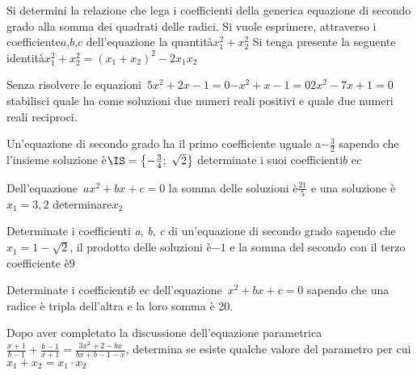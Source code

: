 \begin{esercizio}
 \label{ese:3.70}
Si determini la relazione che lega i coefficienti della generica equazione di 
secondo grado alla somma dei quadrati delle radici. Si vuole esprimere,
attraverso i coefficiente$a$,$b$,$c$ dell'equazione la quantità$x_{1}^{2} + 
x_{2}^{2}$ Si tenga presente la seguente identità$x_{1}^{2} + x_{2}^{2} = 
(x_{1} + x_{2} )^{2}-2 x_{1} x_{2}$
\end{esercizio}

\begin{esercizio}
 \label{ese:3.71}
Senza risolvere le equazioni~$5 x^{2} + 2 x-1 = 0$$-x^{2} + x-1 = 0$$2 
x^{2}-7 x +1 = 0$ stabilisci quale ha come soluzioni due numeri reali positivi e 
quale due numeri reali reciproci.
\end{esercizio}

\begin{esercizio}
 \label{ese:3.72}
Un'equazione di secondo grado ha il primo coefficiente uguale a$- \frac{3}{2}$ 
sapendo che l'insieme soluzione è$\IS = \left\{-\frac{3}{4};~\sqrt{2} \right\}$
determinate i suoi coefficienti$b$ e$c$
\end{esercizio}

\begin{esercizio}
 \label{ese:3.73}
Dell'equazione~$a x^{2} + b x + c = 0$ la somma delle soluzioni è$\frac{21}{5}$ 
e una soluzione è$x_{1} = 3,2$ determinare$x_{2}$
\end{esercizio}

\begin{esercizio}
 \label{ese:3.74}
Determinate i coefficienti \emph{a}, \emph{b}, \emph{c} di un'equazione di 
secondo grado sapendo che$x_{1} = 1-\sqrt{2}$, il prodotto delle soluzioni è$- 
1$
e la somma del secondo con il terzo coefficiente è$9$
\end{esercizio}

\begin{esercizio}
 \label{ese:3.75}
Determinate i coefficienti$b$ e$c$ dell'equazione~$x^{2} + b x + c = 0$ 
sapendo che una radice è tripla dell'altra e la loro somma è 20.
\end{esercizio}

\begin{esercizio}[\Ast]
 \label{ese:3.76}
Dopo aver completato la discussione dell'equazione parametrica$\frac{x + 
1}{b-1} + \frac{b-1}{x + 1}=\frac{3 x^{2} + 2-b x}{b x + b-1-x}$, determina se 
esiste qualche valore del parametro per cui$x_{1} + x_{2} = x_{1} \cdot x_{2}$
\end{esercizio}

